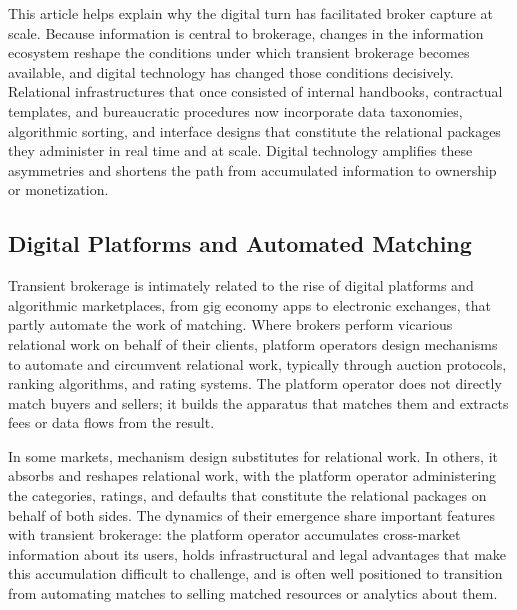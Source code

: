 \documentclass[
]{article}
\begin{document}
This article helps explain why the digital turn has facilitated broker capture at scale. Because information is central to brokerage, changes in the information ecosystem reshape the conditions under which transient brokerage becomes available, and digital technology has changed those conditions decisively. Relational infrastructures that once consisted of internal handbooks, contractual templates, and bureaucratic procedures now incorporate data taxonomies, algorithmic sorting, and interface designs that constitute the relational packages they administer in real time and at scale. Digital technology amplifies these asymmetries and shortens the path from accumulated information to ownership or monetization.

\subsection{Digital Platforms and Automated Matching}

Transient brokerage is intimately related to the rise of digital platforms and algorithmic marketplaces, from gig economy apps to electronic exchanges, that partly automate the work of matching. Where brokers perform vicarious relational work on behalf of their clients, platform operators design mechanisms to automate and circumvent relational work, typically through auction protocols, ranking algorithms, and rating systems. The platform operator does not directly match buyers and sellers; it builds the apparatus that matches them and extracts fees or data flows from the result.

In some markets, mechanism design substitutes for relational work. In others, it absorbs and reshapes relational work, with the platform operator administering the categories, ratings, and defaults that constitute the relational packages on behalf of both sides. The dynamics of their emergence share important features with transient brokerage: the platform operator accumulates cross-market information about its users, holds infrastructural and legal advantages that make this accumulation difficult to challenge, and is often well positioned to transition from automating matches to selling matched resources or analytics about them.
\end{document}
